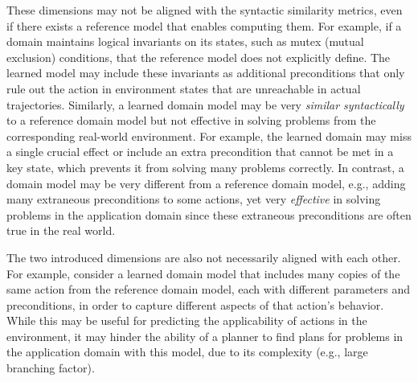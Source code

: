 \documentclass[letterpaper]{article} %
\newif\ifaddcomments
\newcommand{\roni}[1]{\ifaddcomments{\textcolor{red}{[Roni: #1]}}\fi}
\newcommand{\yarin}[1]{\ifaddcomments{\textcolor{teal}{[Yarin: #1]}}\fi}
\newcommand{\gregor}[1]{\ifaddcomments{\textcolor{orange}{[Gregor: #1]}}\fi}
\begin{document}
These dimensions may not be aligned with the syntactic similarity metrics, even if there exists a reference model that enables computing them.  
For example, if a domain maintains logical invariants on its states, such as mutex (mutual exclusion) conditions, that the reference model does not explicitly define. The learned model may include these invariants as additional preconditions that only rule out the action in environment states that are unreachable in actual trajectories.
Similarly, a learned domain model may be very \emph{similar syntactically} to a reference domain model but not effective in solving problems from the corresponding real-world environment. 
For example, the learned domain may miss a single crucial effect or include an extra precondition that cannot be met in a key state, which prevents it from solving many problems correctly. 
In contrast, a domain model may be very different from a reference domain model, e.g., adding many extraneous preconditions to some actions, yet very \emph{effective} in solving problems in the application domain since these extraneous preconditions are often true in the real world. 


The two introduced dimensions are also not necessarily aligned with each other. %
For example, consider a learned domain model that includes many copies of the same action from the reference domain model, each with different parameters and preconditions, in order to capture different aspects of that action's behavior. 
While this may be useful for predicting the applicability of actions in the environment, 
it may hinder the ability of a planner to find plans for problems in the application domain with this model, due to its complexity (e.g., large branching factor). 
\end{document}
